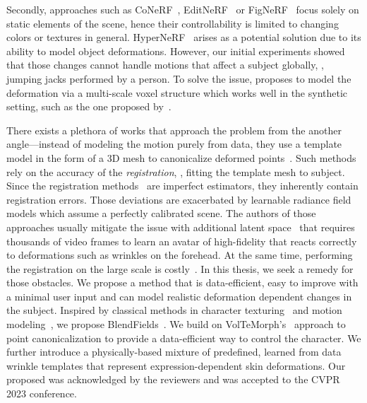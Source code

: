   Secondly, approaches such as CoNeRF~\cite{kania2022conerf},
  EditNeRF~\cite{liu2021editing} or FigNeRF~\cite{xie2021fig} focus solely on
  static elements of the scene, hence their controllability is limited to
  changing colors or textures in general.
  HyperNeRF~\cite{park2021hypernerf} arises as a potential solution due to its
  ability to model object deformations.
  However, our initial experiments showed that those changes cannot handle
  motions that affect a subject globally, \eg, jumping jacks performed by a
  person.
  To solve the issue, \textcite{fang2022fast} proposes to model the deformation
  via a multi-scale voxel structure which works well in the synthetic setting,
  such as the one proposed by~\textcite{pumarola2021d}.

  There exists a plethora of works that approach the problem from the another
  angle---instead of modeling the motion purely from data, they use a template
  model in the form of a 3D mesh to canonicalize deformed
  points~\cite{zielonka2022instant}.
  Such methods rely on the accuracy of the \textit{registration}, \ie, fitting
  the template mesh to subject.
  Since the registration methods~\cite{feng2021learning, zielonka2022towards}
  are imperfect estimators, they inherently contain registration errors.
  Those deviations are exacerbated by learnable radiance field models which
  assume a perfectly calibrated scene.
  The authors of those approaches usually mitigate the issue with additional
  latent space~\cite{grassal2022neural,kania2022conerf,martin2021nerf} that
  requires thousands of video frames to learn an avatar of high-fidelity that
  reacts correctly to deformations such as wrinkles on the forehead.
  At the same time, performing the registration on the large scale is
  costly~\cite{cao2022authentic}.
  In this thesis, we seek a remedy for those obstacles.
  We propose a method that is data-efficient, easy to improve with a minimal
  user input and can model realistic deformation dependent changes in the
  subject.
  Inspired by classical methods in character texturing~\cite{oat2007animated}
  and motion modeling~\cite{lewis2014practice}, we propose
  BlendFields~\cite{kania2023blendfields}.
  We build on VolTeMorph's~\cite{garbin2024voltemorph} approach to point
  canonicalization to provide a data-efficient way to control the character.
  We further introduce a physically-based mixture of predefined, learned from
  data wrinkle templates that represent expression-dependent skin deformations.
  Our proposed was acknowledged by the reviewers and was accepted to the CVPR
  2023 conference.

